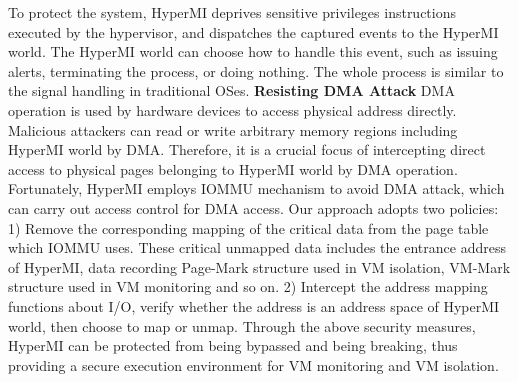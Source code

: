 \documentclass[conference]{IEEEtran}
\begin{document}
To protect the system, HyperMI deprives sensitive privileges instructions executed by the hypervisor, and dispatches the captured events to the HyperMI world. The HyperMI world can choose how to handle this event, such as issuing alerts, terminating the process, or doing nothing. The whole process is similar to the signal handling in traditional OSes.
\textbf{Resisting DMA Attack}
DMA operation is used by hardware devices to access physical address directly. Malicious attackers can read or write arbitrary memory regions including HyperMI world by DMA. Therefore, it is a crucial focus of intercepting direct access to physical pages belonging to HyperMI world by DMA operation. 
Fortunately, HyperMI employs IOMMU mechanism to avoid DMA attack, which can carry out access control for DMA access. Our approach adopts two policies: 1) Remove the corresponding mapping of the critical data from the page table which IOMMU uses. These critical unmapped data includes the entrance address of HyperMI, data recording Page-Mark structure used in VM isolation, VM-Mark structure used in VM monitoring and so on. 2) Intercept the address mapping functions about I/O, verify whether the address is an address space of HyperMI world, then choose to map or unmap.
Through the above security measures, HyperMI can be protected from being bypassed and being breaking, thus providing a secure execution environment for VM monitoring and VM isolation.

\end{document}
